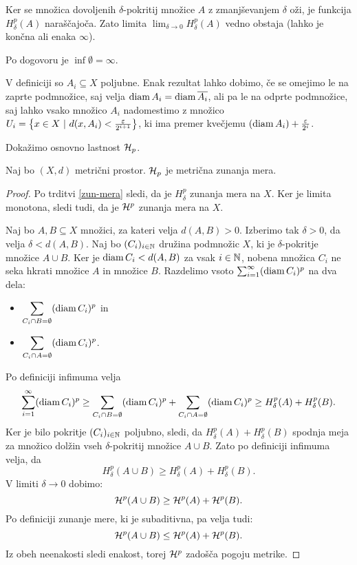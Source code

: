 \begin{opomba}
    Ker se množica dovoljenih \(\delta\)-pokritij množice \(A\) z zmanjševanjem \(\delta\) oži, je funkcija \(H^p_\delta(A)\) naraščajoča. Zato limita \(\lim_{\delta \to 0} H^p_\delta(A)\) vedno obstaja (lahko je končna ali enaka \(\infty\)).
\end{opomba}

\begin{opomba} 
    Po dogovoru je \(\inf \emptyset = \infty\).
\end{opomba}

\begin{opomba}
    \label{odp-zap-haus}
    V definiciji so \(A_i \subseteq X\) poljubne. Enak rezultat lahko dobimo, če se omejimo le na zaprte podmnožice, saj velja \(\operatorname{diam} A_i = \operatorname{diam} \overline{A_i}\), ali pa le na odprte podmnožice, saj lahko vsako množico \(A_i\) nadomestimo z množico \(U_i = \left\{x \in X \ | \ d(x, A_i) < \frac{\varepsilon}{2^{i+1}}\right\}\), ki ima premer kvečjemu \((\operatorname{diam} A_i) + \frac{\varepsilon}{2^i}\).
\end{opomba}

Dokažimo osnovno lastnost \(\mathcal{H}_p\).
\begin{trditev}
    \label{haus-m-zun}
    Naj bo \((X, d)\) metrični prostor. \(\mathcal{H}_p\) je metrična zunanja mera.
\end{trditev}

\begin{proof}
    Po trditvi \ref{zun-mera} sledi, da je \(H^p_\delta\) zunanja mera na \(X\). Ker je limita monotona, sledi tudi, da je \(\mathcal{H}^p\) zunanja mera na \(X\).

    Naj bo \(A, B \subseteq X\) množici, za kateri velja \(d(A, B) > 0\). Izberimo tak \(\delta > 0\), da velja \(\delta < d(A, B)\). Naj bo \((C_i)_{i \in \mathbb{N}}\) družina podmnožic \(X\), ki je \(\delta\)-pokritje množice \(A \cup B\).
    Ker je \(\operatorname{diam} C_i < d(A, B)\) za vsak \(i \in \mathbb{N}\), nobena množica \(C_i\) ne seka hkrati množice \(A\) in množice \(B\). Razdelimo vsoto \(\sum_{i=1}^{\infty} (\operatorname{diam} C_i)^p\) na dva dela:
    \begin{itemize}
        \item \(\displaystyle \sum_{C_i \cap B = \emptyset} (\operatorname{diam} C_i)^p\) in
        \item \(\displaystyle \sum_{C_i \cap A = \emptyset} (\operatorname{diam} C_i)^p\).
    \end{itemize}
    Po definiciji infimuma velja 
    \[\sum_{i=1}^{\infty} (\operatorname{diam} C_i)^p \geq \displaystyle \sum_{C_i \cap B = \emptyset} (\operatorname{diam} C_i)^p + \displaystyle \sum_{C_i \cap A = \emptyset} (\operatorname{diam} C_i)^p \geq H^p_\delta(A) + H^p_\delta(B).\]
    Ker je bilo pokritje \((C_i)_{i \in \mathbb{N}}\) poljubno, sledi, da \(H^p_\delta(A) + H^p_\delta(B)\) spodnja meja za množico dolžin vseh \(\delta\)-pokritij množice \(A \cup B\). Zato po definiciji infimuma velja, da
    \[H_\delta^p(A \cup B) \geq H^p_\delta(A) + H^p_\delta(B).\]
    V limiti \(\delta \to 0\) dobimo:
    \[\mathcal{H}^p(A \cup B) \geq \mathcal{H}^p(A) + \mathcal{H}^p(B).\]
%
    Po definiciji zunanje mere, ki je subaditivna, pa velja tudi:
    \[\mathcal{H}^p(A \cup B) \leq \mathcal{H}^p(A) + \mathcal{H}^p(B).\]
    Iz obeh neenakosti sledi enakost, torej \(\mathcal{H}^p\) zadošča pogoju metrike.
\end{proof}

